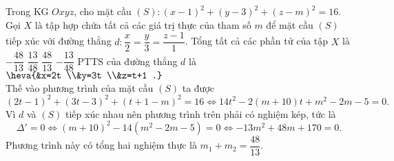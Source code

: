 \begin{ex}%
Trong KG $Oxyz$, cho mặt cầu $\left(S\right)\colon(x-1)^2 + (y-3)^2 + (z-m)^2 = 16$. Gọi $X$ là tập hợp chứa tất cả các giá trị thực của tham số $m$ để mặt cầu $\left(S\right)$ tiếp xúc với đường thẳng $d\colon\dfrac{x}{2} = \dfrac{y}{3} = \dfrac{z-1}{1}$. Tổng tất cả các phần tử của tập $X$ là
\choice
{$-\dfrac{48}{13}$}
{$\dfrac{13}{48}$}
{\True $\dfrac{48}{13}$}
{$-\dfrac{13}{48}$}
\loigiai
{
PTTS của đường thẳng $d$ là $\heva{&x=2t \\&y=3t \\&z=t+1  .}$\\
Thế vào phương trình của mặt cầu $\left(S\right)$ ta được
\[(2t-1)^2 + (3t-3)^2 + (t+1-m)^2 = 16 \Leftrightarrow 14t^2 - 2(m+10)t + m^2 - 2m -5 = 0.\]
Vì $d$ và $\left(S\right)$ tiếp xúc nhau nên phương trình trên phải có nghiệm kép, tức là
\[\Delta' = 0 \Leftrightarrow (m + 10)^2 - 14(m^2 - 2m -5) = 0\Leftrightarrow -13m^2 + 48m + 170 = 0.\]
Phương trình này có tổng hai nghiệm thực là $m_1 + m_2 = \dfrac{48}{13}$.
}
\end{ex}



